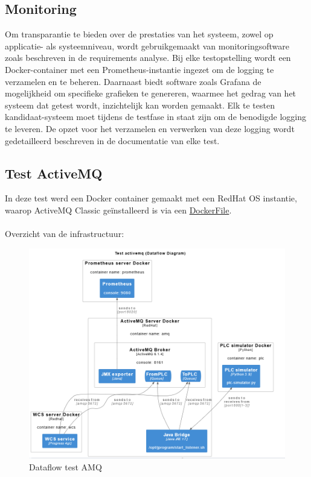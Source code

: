 \subsection{Monitoring}
Om transparantie te bieden over de prestaties van het systeem, zowel op applicatie- als systeemniveau, 
wordt gebruikgemaakt van monitoringsoftware zoals beschreven in de requirements analyse.
Bij elke testopstelling wordt een Docker-container met een Prometheus-instantie ingezet om de logging te verzamelen en te beheren.
Daarnaast biedt software zoals Grafana de mogelijkheid om specifieke grafieken te genereren, 
waarmee het gedrag van het systeem dat getest wordt, inzichtelijk kan worden gemaakt.
Elk te testen kandidaat-systeem moet tijdens de testfase in staat zijn om de benodigde logging te leveren. 
De opzet voor het verzamelen en verwerken van deze logging wordt gedetailleerd beschreven in de documentatie van elke test.
\newpage

\subsection{Test ActiveMQ}
In deze test werd een Docker container gemaakt met een RedHat OS instantie, waarop ActiveMQ Classic 
geïnstalleerd is via een \hyperref[listing:docker_amq]{DockerFile}.
\\\\
Overzicht van de infrastructuur:
\begin{figure}[h!]
  \centering
  \includegraphics[width=.95\textwidth]{img/test_amq_dataflow.png}
  \caption{\label{fig:test_amq_dataflow}Dataflow test AMQ}
\end{figure}

